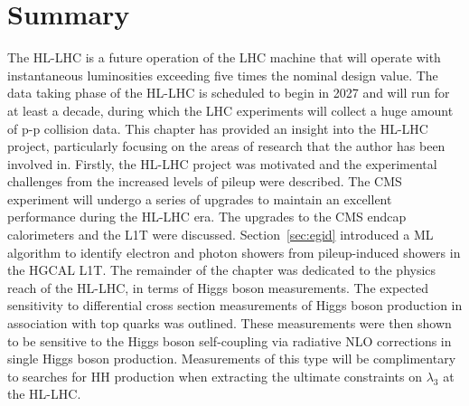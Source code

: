 \section{Summary}
The HL-LHC is a future operation of the LHC machine that will operate with instantaneous luminosities exceeding five times the nominal design value. The data taking phase of the HL-LHC is scheduled to begin in 2027 and will run for at least a decade, during which the LHC experiments will collect a huge amount of p-p collision data. This chapter has provided an insight into the HL-LHC project, particularly focusing on the areas of research that the author has been involved in. Firstly, the HL-LHC project was motivated and the experimental challenges from the increased levels of pileup were described. The CMS experiment will undergo a series of upgrades to maintain an excellent performance during the HL-LHC era. The upgrades to the CMS endcap calorimeters and the L1T were discussed. Section~\ref{sec:egid} introduced a ML algorithm to identify electron and photon showers from pileup-induced showers in the HGCAL L1T. The remainder of the chapter was dedicated to the physics reach of the HL-LHC, in terms of Higgs boson measurements. The expected sensitivity to differential cross section measurements of Higgs boson production in association with top quarks was outlined. These measurements were then shown to be sensitive to the Higgs boson self-coupling via radiative NLO corrections in single Higgs boson production. Measurements of this type will be complimentary to searches for HH production when extracting the ultimate constraints on $\lambda_3$ at the HL-LHC.